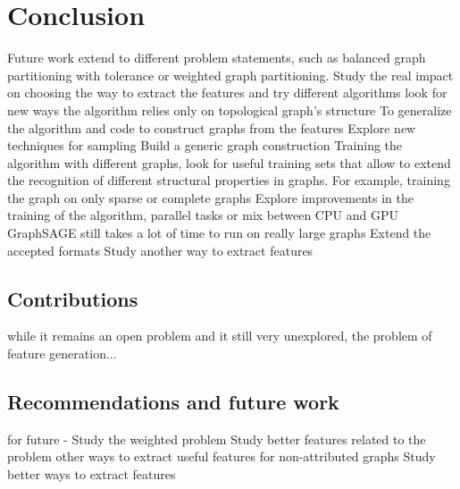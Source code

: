 
\chapter{Conclusion}
\label{Conclusion}

Future work
extend to different problem statements, such as balanced graph partitioning with tolerance or weighted graph partitioning.
Study the real impact on choosing the way to extract the features and try different algorithms
look for new ways the algorithm relies only on topological graph's structure
To generalize the algorithm and code to construct graphs from the features
Explore new techniques for sampling
Build a generic graph construction
Training the algorithm with different graphs, look for useful training sets that allow to extend the recognition of different structural properties in graphs. For example, training the graph on only sparse or complete graphs
Explore improvements in the training of the algorithm, parallel tasks or mix between CPU and GPU
GraphSAGE still takes a lot of time to run on really large graphs
Extend the accepted formats 
Study another way to extract features
\section{Contributions}
while it remains an open problem and it still very unexplored, the problem of feature generation...
\section{Recommendations and future work}
for future - Study the weighted problem
Study better features related to the problem
other ways to extract useful features for non-attributed graphs
Study better ways to extract features
\clearpage